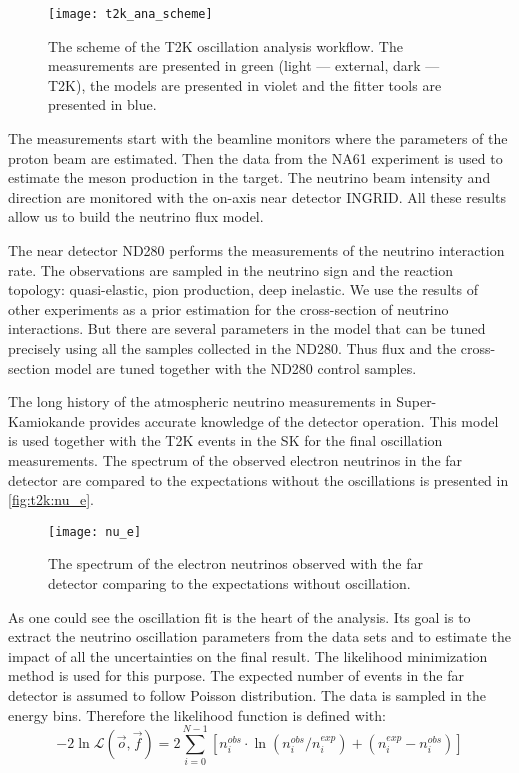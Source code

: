 \documentclass[../main.tex]{subfiles}
\begin{document}
\begin{figure}[!ht]
  \centering
  \texttt{[image: t2k\_ana\_scheme]}
  \caption{The scheme of the T2K oscillation analysis workflow. The measurements are presented in green (light --- external, dark --- T2K), the models are presented in violet and the fitter tools are presented in blue.}
  \label{fig:t2k:ana}
\end{figure}

The measurements start with the beamline monitors where the parameters of the proton beam are estimated. Then the data from the NA61 experiment is used to estimate the meson production in the target. The neutrino beam intensity and direction are monitored with the on-axis near detector INGRID. All these results allow us to build the neutrino flux model.

The near detector ND280 performs the measurements of the neutrino interaction rate. The observations are sampled in the neutrino sign and the reaction topology: quasi-elastic, pion production, deep inelastic. We use the results of other experiments as a prior estimation for the cross-section of neutrino interactions. But there are several parameters in the model that can be tuned precisely using all the samples collected in the ND280. Thus flux and the cross-section model are tuned together with the ND280 control samples.

The long history of the atmospheric neutrino measurements in Super-Kamiokande provides accurate knowledge of the detector operation. This model is used together with the T2K events in the SK for the final oscillation measurements. The spectrum of the observed electron neutrinos in the far detector are compared to the expectations without the oscillations is presented in \autoref{fig:t2k:nu_e}.

\begin{figure}[!ht]
  \centering
  \texttt{[image: nu\_e]}
  \caption{The spectrum of the electron neutrinos observed with the far detector comparing to the expectations without oscillation.}
  \label{fig:t2k:nu_e}
\end{figure}

As one could see the oscillation fit is the heart of the analysis. Its goal is to extract the neutrino oscillation parameters from the data sets and to estimate the impact of all the uncertainties on the final result. The likelihood minimization method is used for this purpose. The expected number of events in the far detector is assumed to follow Poisson distribution. The data is sampled in the energy bins. Therefore the likelihood function is defined with:
\begin{equation}
-2\ln\mathcal{L}\left(\overrightarrow{o}, \overrightarrow{f}\right)=2\sum^{N-1}_{i=0}\left[n_i^{obs}\cdot\ln\left(n_i^{obs}/n_i^{exp}\right)+\left(n_i^{exp}-n_i^{obs}\right)\right]
\end{equation}
\end{document}

